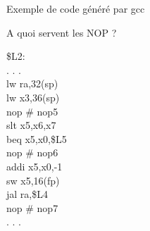 %
\begin{Frame}{Exemple de code g\'en\'er\'e par gcc}

 
\begin{block} {A quoi servent les NOP ?}

\$L2:\\
	\hspace{0,5cm} . . .\\
\hspace{0,5cm} lw \hspace{0,5cm}ra,32(sp) \\
\hspace{0,5cm} lw \hspace{0,5cm}x3,36(sp)\\
\hspace{0,5cm} \textcolor{tagada}{nop} 	\hspace{0,99cm}\# nop5\\
\hspace{0,5cm} slt   \hspace{0,5cm}x5,x6,x7\\
\hspace{0,5cm} beq \hspace{0,3cm}x5,x0,\$L5\\
\hspace{0,5cm} \textcolor{tagada}{nop}		\hspace{0,99cm}\# nop6\\
\hspace{0,5cm} addi    \hspace{0,25cm}x5,x0,-1\\
\hspace{0,5cm} sw   \hspace{0,5cm}x5,16(fp)\\
\hspace{0,5cm} jal      \hspace{0,5cm}ra,\$L4\\
\hspace{0,5cm} \textcolor{tagada}{nop}	\hspace{0,99cm}\# nop7\\
\hspace{0,5cm} . . .\\

\end{block}


      
\end{Frame}


